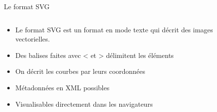 \begin{frame}{Le format SVG}
  \begin{columns}
    \begin{column}{.5\linewidth}
      \begin{itemize}
      \item Le format SVG est un format en mode texte qui décrit des images
        vectorielles.
      \item Des balises faites avec < et > délimitent les éléments
      \item On décrit les courbes par leurs coordonnées
      \item Métadonnées en XML possibles
      \item Visualisables directement dans les navigateurs
      \end{itemize}
    \end{column}
    \begin{column}{.5\linewidth}
      
    \end{column}
  \end{columns}
  
\end{frame}
